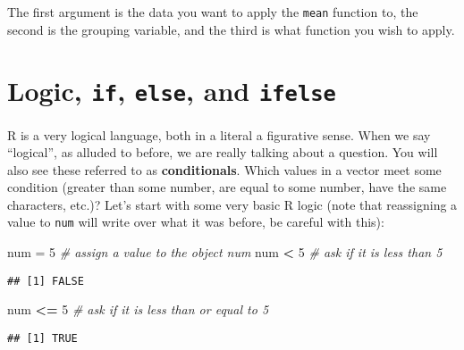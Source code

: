 \documentclass[]{book}
\newenvironment{Shaded}{\begin{snugshade}}{\end{snugshade}}
\newcommand{\KeywordTok}[1]{\textcolor[rgb]{0.13,0.29,0.53}{\textbf{#1}}}
\newcommand{\DecValTok}[1]{\textcolor[rgb]{0.00,0.00,0.81}{#1}}
\newcommand{\StringTok}[1]{\textcolor[rgb]{0.31,0.60,0.02}{#1}}
\newcommand{\CommentTok}[1]{\textcolor[rgb]{0.56,0.35,0.01}{\textit{#1}}}
\newcommand{\OperatorTok}[1]{\textcolor[rgb]{0.81,0.36,0.00}{\textbf{#1}}}
\newcommand{\NormalTok}[1]{#1}
\theoremstyle{definition}
\theoremstyle{definition}
\theoremstyle{definition}
\theoremstyle{remark}
\begin{document}
\begin{Shaded}
\end{Shaded}

The first argument is the data you want to apply the \texttt{mean}
function to, the second is the grouping variable, and the third is what
function you wish to apply.

\chapter{\texorpdfstring{Logic, \texttt{if}, \texttt{else}, and
\texttt{ifelse}}{Logic, if, else, and ifelse}}\label{logic-if-else-and-ifelse}

R is a very logical language, both in a literal a figurative sense. When
we say ``logical'', as alluded to before, we are really talking about a
question. You will also see these referred to as \textbf{conditionals}.
Which values in a vector meet some condition (greater than some number,
are equal to some number, have the same characters, etc.)? Let's start
with some very basic R logic (note that reassigning a value to
\texttt{num} will write over what it was before, be careful with this):

\begin{Shaded}
\begin{Highlighting}[]
\NormalTok{num =}\StringTok{ }\DecValTok{5}   \CommentTok{# assign a value to the object num}
\NormalTok{num }\OperatorTok{<}\StringTok{ }\DecValTok{5}   \CommentTok{# ask if it is less than 5}
\end{Highlighting}
\end{Shaded}

\begin{verbatim}
## [1] FALSE
\end{verbatim}

\begin{Shaded}
\begin{Highlighting}[]
\NormalTok{num }\OperatorTok{<=}\StringTok{ }\DecValTok{5}  \CommentTok{# ask if it is less than or equal to 5}
\end{Highlighting}
\end{Shaded}

\begin{verbatim}
## [1] TRUE
\end{verbatim}
\end{document}
